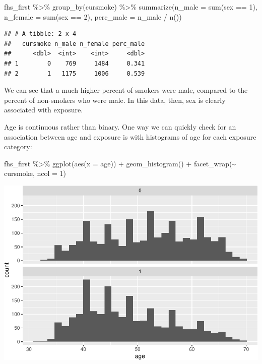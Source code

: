 \documentclass[
]{book}
\newenvironment{Shaded}{\begin{snugshade}}{\end{snugshade}}
\newcommand{\AttributeTok}[1]{\textcolor[rgb]{0.77,0.63,0.00}{#1}}
\newcommand{\DecValTok}[1]{\textcolor[rgb]{0.00,0.00,0.81}{#1}}
\newcommand{\FunctionTok}[1]{\textcolor[rgb]{0.00,0.00,0.00}{#1}}
\newcommand{\NormalTok}[1]{#1}
\newcommand{\SpecialCharTok}[1]{\textcolor[rgb]{0.00,0.00,0.00}{#1}}
\begin{document}
\begin{Shaded}
\begin{Highlighting}[]
\NormalTok{fhs\_first }\SpecialCharTok{\%\textgreater{}\%} 
  \FunctionTok{group\_by}\NormalTok{(cursmoke) }\SpecialCharTok{\%\textgreater{}\%} 
  \FunctionTok{summarize}\NormalTok{(}\AttributeTok{n\_male =} \FunctionTok{sum}\NormalTok{(sex }\SpecialCharTok{==} \DecValTok{1}\NormalTok{), }
            \AttributeTok{n\_female =} \FunctionTok{sum}\NormalTok{(sex }\SpecialCharTok{==} \DecValTok{2}\NormalTok{), }
            \AttributeTok{perc\_male =}\NormalTok{ n\_male }\SpecialCharTok{/} \FunctionTok{n}\NormalTok{())}
\end{Highlighting}
\end{Shaded}

\begin{verbatim}
## # A tibble: 2 x 4
##   cursmoke n_male n_female perc_male
##      <dbl>  <int>    <int>     <dbl>
## 1        0    769     1484     0.341
## 2        1   1175     1006     0.539
\end{verbatim}

We can see that a much higher percent of smokers were male, compared to the percent of non-smokers who were male. In this data, then, sex is clearly associated with exposure.

Age is continuous rather than binary. One way we can quickly check for an association between age and exposure is with histograms of age for each exposure category:

\begin{Shaded}
\begin{Highlighting}[]
\NormalTok{fhs\_first }\SpecialCharTok{\%\textgreater{}\%} 
  \FunctionTok{ggplot}\NormalTok{(}\FunctionTok{aes}\NormalTok{(}\AttributeTok{x =}\NormalTok{ age)) }\SpecialCharTok{+} 
  \FunctionTok{geom\_histogram}\NormalTok{() }\SpecialCharTok{+} 
  \FunctionTok{facet\_wrap}\NormalTok{(}\SpecialCharTok{\textasciitilde{}}\NormalTok{ cursmoke, }\AttributeTok{ncol =} \DecValTok{1}\NormalTok{)}
\end{Highlighting}
\end{Shaded}

\includegraphics{adv_epi_analysis_files/figure-latex/unnamed-chunk-253-1.pdf}
\end{document}
